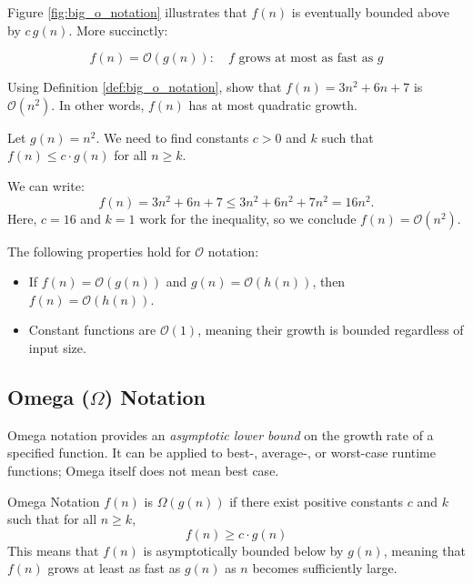 Figure \ref{fig:big_o_notation} illustrates that $f(n)$ is eventually bounded above by $c\,g(n)$. More succinctly:

\[
f(n)=\mathcal{O}(g(n)): \quad f \text{ grows at most as fast as } g
\]


\begin{example}
    Using Definition \ref{def:big_o_notation}, show that $f(n)=3n^2+6n+7$ is $\mathcal{O}(n^2)$. In other words, $f(n)$ has at most quadratic growth.
\end{example}

\begin{solution}
    Let $g(n) = n^2$. We need to find constants $c > 0$ and $k$ such that $f(n) \leq c \cdot g(n)$ for all $n \geq k$.
    
    We can write:
    \[
    f(n) = 3n^2 + 6n + 7 \leq 3n^2 + 6n^2 + 7n^2 = 16n^2.
    \]
    Here, $c = 16$ and $k = 1$ work for the inequality, so we conclude $f(n) = \mathcal{O}(n^2)$.
\end{solution}

The following properties hold for $\mathcal{O}$ notation:
\begin{itemize}
    \item If $f(n) = \mathcal{O}(g(n))$ and $g(n) = \mathcal{O}(h(n))$, then $f(n) = \mathcal{O}(h(n))$.
    \item Constant functions are $\mathcal{O}(1)$, meaning their growth is bounded regardless of input size.
\end{itemize}

\subsection*{Omega (\texorpdfstring{$\Omega$}{Omega}) Notation}

Omega notation provides an \textit{asymptotic lower bound} on the growth rate of a specified function. It can be applied to best-, average-, or worst-case runtime functions; Omega itself does not mean best case. \newpage

\begin{definition}{Omega Notation}\label{def:omega_notation}
    $f(n)$ is $\Omega(g(n))$ if there exist positive constants $c$ and $k$ such that for all $n \geq k$,
    \medskip
    \[
    f(n) \geq c \cdot g(n)
    \]
    \medskip
    This means that $f(n)$ is asymptotically bounded below by $g(n)$, meaning that $f(n)$ grows at least as fast as $g(n)$ as $n$ becomes sufficiently large.
\end{definition}

